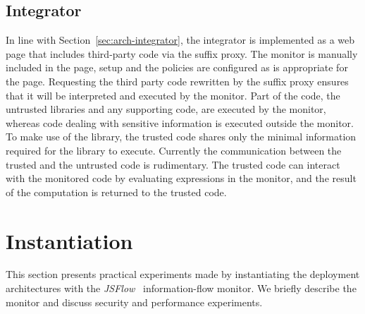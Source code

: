 \documentclass{llncs}
\begin{document}
\vspace{-.4cm}
\subsection{Integrator}
\vspace{-.2cm}


In line with Section~\ref{sec:arch-integrator}, the integrator is implemented as 
a web page that includes third-party code via the suffix proxy. The monitor is 
manually included in the page, setup and the policies are configured as is 
appropriate for the page. Requesting the third party code rewritten by the suffix 
proxy ensures that it will be interpreted and executed by the 
monitor.
%
Part of the code, the untrusted libraries and any supporting code,
are executed by the monitor, whereas code dealing with sensitive 
information is executed outside the monitor. To make use of the library, 
the trusted code shares only the minimal information required for the 
library to execute. Currently the communication between the trusted and the 
untrusted code is rudimentary. The trusted code can interact with the monitored 
code by evaluating expressions in the monitor, and the result of the computation
is returned to the trusted code. 





\vspace{-.4cm}
\section{Instantiation}
\label{sec:case}
\vspace{-.4cm}

This section presents practical experiments made by instantiating the deployment
architectures with the \emph{JSFlow}~\cite{Hedin:Sabelfeld:CSF12,JSFlow} information-flow monitor. 
We briefly describe the monitor and discuss security and performance experiments.
\end{document}

